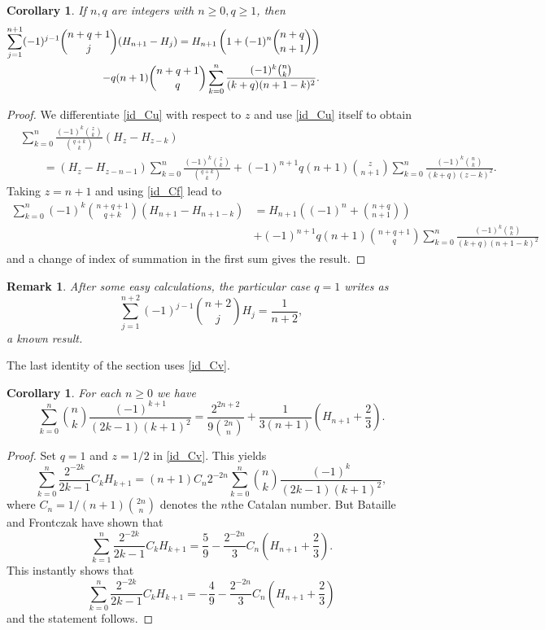 \documentclass[11pt,reqno]{amsart}
\theoremstyle{plain}
\numberwithin{equation}{section}
\newtheorem{corollary}[thm]{Corollary}
\newtheorem{remark}[thm]{Remark}
\begin{document}
\begin{corollary} 
If $n,q$ are integers with $n\ge 0,q\ge 1$, then
\begin{multline*}
\shoveright{\sum_{j=1}^{n+1}(-1)^{j-1}\binom{n+q+1}{j}(H_{n+1}-H_j)= H_{n+1}\left(1+(-1)^n\binom{n+q}{n+1}\right)\qquad\qquad\qquad\qquad}\\%
-q(n+1)\binom{n+q+1}{q}\sum_{k=0}^n\frac{(-1)^k\binom{n}{k}}{(k+q)(n+1-k)^2}.
\end{multline*}
\end{corollary}
\begin{proof}
We differentiate \eqref{id_Cu} with respect to $z$ and use \eqref{id_Cu} itself to obtain 
\begin{align*}
&\sum_{k=0}^n \frac{(-1)^k\binom{z}{k}}{\binom{q+k}{k}}(H_z-H_{z-k}) \\
&\qquad = (H_z-H_{z-n-1})\sum_{k=0}^n\frac{(-1)^k\binom{z}{k}}{\binom{q+k}{k}}+(-1)^{n+1} q(n+1)\binom{z}{n+1}\sum_{k=0}^n\frac{(-1)^k\binom{n}{k}}{(k+q)(z-k)^2}.
\end{align*}
Taking $z=n+1$ and using \eqref{id_Cf} lead to 
\begin{align*}
 \sum_{k=0}^n(-1)^k\binom{n+q+1}{q+k}(H_{n+1}-H_{n+1-k}) &= H_{n+1}\left((-1)^n+\binom{n+q}{n+1}\right) \\
 & +(-1)^{n+1} q(n+1)\binom{n+q+1}{q}\sum_{k=0}^n\frac{(-1)^k\binom{n}{k}}{(k+q)(n+1-k)^2}
 \end{align*}
 and a change of index of summation in the first sum gives the result.
\end{proof}

\begin{remark} After some easy calculations, the particular case $q=1$ writes as 
\begin{equation}\label{eq_12}  
\sum_{j=1}^{n+2}(-1)^{j-1}\binom{n+2}{j}H_j=\frac{1}{n+2},
\end{equation}
a known result.
\end{remark}
The last identity of the section uses \eqref{id_Cv}.
\begin{corollary}
For each $n\geq 0$ we have
\begin{equation*}
\sum_{k=0}^n \binom{n}{k} \frac{(-1)^{k+1}}{(2k-1)(k+1)^2} 
= \frac{2^{2n+2}}{9\binom{2n}{n}} + \frac{1}{3(n+1)}\left ( H_{n+1} + \frac{2}{3}\right ).
\end{equation*}
\end{corollary}
\begin{proof}
Set $q=1$ and $z=1/2$ in \eqref{id_Cv}. This yields
$$\sum_{k=0}^n \frac{2^{-2k}}{2k-1} C_k H_{k+1} = (n+1)C_n 2^{-2n}\sum_{k=0}^n \binom{n}{k} \frac{(-1)^{k}}{(2k-1)(k+1)^2},$$
where $C_n=1/(n+1)\binom{2n}{n}$ denotes the $n$the Catalan number. But Bataille and Frontczak \cite[Corollary 4.2]{Bataille2} 
have shown that
$$\sum_{k=1}^n \frac{2^{-2k}}{2k-1} C_k H_{k+1} = \frac{5}{9} - \frac{2^{-2n}}{3} C_n \left (H_{n+1} + \frac{2}{3} \right ).$$
This instantly shows that
$$\sum_{k=0}^n \frac{2^{-2k}}{2k-1} C_k H_{k+1} = - \frac{4}{9} - \frac{2^{-2n}}{3} C_n \left (H_{n+1} + \frac{2}{3} \right )$$
and the statement follows.
\end{proof}
\end{document}
